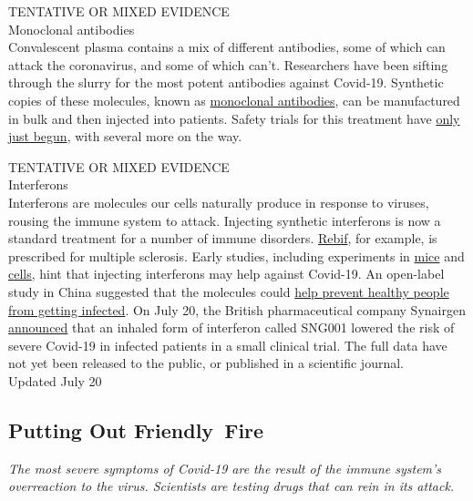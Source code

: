 TENTATIVE OR MIXED EVIDENCE\\
Monoclonal antibodies\\
Convalescent plasma contains a mix of different antibodies, some of
which can attack the coronavirus, and some of which can't. Researchers
have been sifting through the slurry for the most potent antibodies
against Covid-19. Synthetic copies of these molecules, known as
\href{https://www.nytimes.com/2020/07/09/health/regeneron-monoclonal-antibodies.html}{monoclonal
antibodies}, can be manufactured in bulk and then injected into
patients. Safety trials for this treatment have
\href{https://investor.lilly.com/news-releases/news-release-details/lilly-begins-worlds-first-study-potential-covid-19-antibody}{only
just begun}, with several more on the way.

TENTATIVE OR MIXED EVIDENCE\\
Interferons\\
Interferons are molecules our cells naturally produce in response to
viruses, rousing the immune system to attack. Injecting synthetic
interferons is now a standard treatment for a number of immune
disorders.
\href{https://www.nationalmssociety.org/Treating-MS/Medications/Rebif}{Rebif},
for example, is prescribed for multiple sclerosis. Early studies,
including experiments in
\href{https://pubmed.ncbi.nlm.nih.gov/32511406/}{mice} and
\href{https://academic.oup.com/jid/article/doi/10.1093/infdis/jiaa350/5860074}{cells},
hint that injecting interferons may help against Covid-19. An open-label
study in China suggested that the molecules could
\href{https://www.medrxiv.org/content/10.1101/2020.04.11.20061473v2}{help
prevent healthy people from getting infected}. On July 20, the British
pharmaceutical company Synairgen
\href{https://www.nytimes.com/2020/07/20/world/covid-19-treatment-synairgen-interferon-beta.html}{announced}
that an inhaled form of interferon called SNG001 lowered the risk of
severe Covid-19 in infected patients in a small clinical trial. The full
data have not yet been released to the public, or published in a
scientific journal.\\
Updated July 20

\hypertarget{putting-out-friendly-fire}{%
\subsection{Putting Out Friendly~Fire}\label{putting-out-friendly-fire}}

\emph{The most severe symptoms of Covid-19 are the result of the immune
system's overreaction to the virus. Scientists are testing drugs that
can rein in its attack.}

